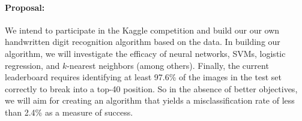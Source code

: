 \documentclass[10pt]{article}
\begin{document}
\paragraph{Proposal:} We intend to participate in the Kaggle competition and build our our own handwritten digit recognition algorithm based on the data. In building our algorithm, we will investigate the efficacy of neural networks, SVMs, logistic regression, and $k$-nearest neighbors (among others). Finally, the current leaderboard requires identifying at least 97.6\% of the images in the test set correctly to break into a top-40 position. So in the absence of better objectives, we will aim for creating an algorithm that yields a misclassification rate of less than 2.4\% as a measure of success.
\end{document}
